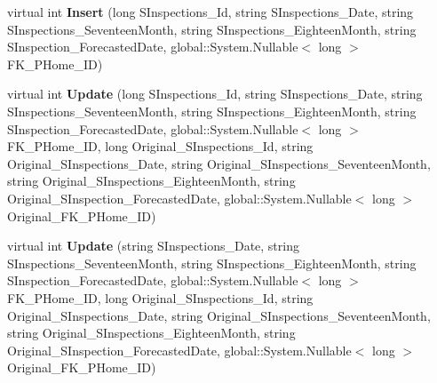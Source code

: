 \begin{DoxyCompactItemize}
\item 
\mbox{\label{class_a_f_h___scheduler_1_1_home_inspection_data_set_table_adapters_1_1_scheduled___inspections_table_adapter_a6282aa9c34fa014ddd281d89e5b0c6bc}} 
virtual int {\bfseries Insert} (long S\+Inspections\+\_\+\+Id, string S\+Inspections\+\_\+\+Date, string S\+Inspections\+\_\+\+Seventeen\+Month, string S\+Inspections\+\_\+\+Eighteen\+Month, string S\+Inspection\+\_\+\+Forecasted\+Date, global\+::\+System.\+Nullable$<$ long $>$ F\+K\+\_\+\+P\+Home\+\_\+\+ID)
\item 
\mbox{\label{class_a_f_h___scheduler_1_1_home_inspection_data_set_table_adapters_1_1_scheduled___inspections_table_adapter_a0cc483c7a83e63be14c775af49266591}} 
virtual int {\bfseries Update} (long S\+Inspections\+\_\+\+Id, string S\+Inspections\+\_\+\+Date, string S\+Inspections\+\_\+\+Seventeen\+Month, string S\+Inspections\+\_\+\+Eighteen\+Month, string S\+Inspection\+\_\+\+Forecasted\+Date, global\+::\+System.\+Nullable$<$ long $>$ F\+K\+\_\+\+P\+Home\+\_\+\+ID, long Original\+\_\+\+S\+Inspections\+\_\+\+Id, string Original\+\_\+\+S\+Inspections\+\_\+\+Date, string Original\+\_\+\+S\+Inspections\+\_\+\+Seventeen\+Month, string Original\+\_\+\+S\+Inspections\+\_\+\+Eighteen\+Month, string Original\+\_\+\+S\+Inspection\+\_\+\+Forecasted\+Date, global\+::\+System.\+Nullable$<$ long $>$ Original\+\_\+\+F\+K\+\_\+\+P\+Home\+\_\+\+ID)
\item 
\mbox{\label{class_a_f_h___scheduler_1_1_home_inspection_data_set_table_adapters_1_1_scheduled___inspections_table_adapter_a0cdd12aebd4512f616b7e812eb308b34}} 
virtual int {\bfseries Update} (string S\+Inspections\+\_\+\+Date, string S\+Inspections\+\_\+\+Seventeen\+Month, string S\+Inspections\+\_\+\+Eighteen\+Month, string S\+Inspection\+\_\+\+Forecasted\+Date, global\+::\+System.\+Nullable$<$ long $>$ F\+K\+\_\+\+P\+Home\+\_\+\+ID, long Original\+\_\+\+S\+Inspections\+\_\+\+Id, string Original\+\_\+\+S\+Inspections\+\_\+\+Date, string Original\+\_\+\+S\+Inspections\+\_\+\+Seventeen\+Month, string Original\+\_\+\+S\+Inspections\+\_\+\+Eighteen\+Month, string Original\+\_\+\+S\+Inspection\+\_\+\+Forecasted\+Date, global\+::\+System.\+Nullable$<$ long $>$ Original\+\_\+\+F\+K\+\_\+\+P\+Home\+\_\+\+ID)
\end{DoxyCompactItemize}
